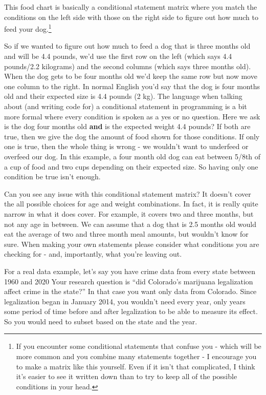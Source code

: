 \documentclass[
]{krantz}
\begin{document}
This food chart is basically a conditional statement matrix where you match the conditions on the left side with those on the right side to figure out how much to feed your dog.\footnote{If you encounter some conditional statements that confuse you - which will be more common and you combine many statements together - I encourage you to make a matrix like this yourself. Even if it isn't that complicated, I think it's easier to see it written down than to try to keep all of the possible conditions in your head.}

So if we wanted to figure out how much to feed a dog that is three months old and will be 4.4 pounds, we'd use the first row on the left (which says 4.4 pounds/2.2 kilograms) and the second columns (which says three months old). When the dog gets to be four months old we'd keep the same row but now move one column to the right. In normal English you'd say that the dog is four months old and their expected size is 4.4 pounds (2 kg). The language when talking about (and writing code for) a conditional statement in programming is a bit more formal where every condition is spoken as a yes or no question. Here we ask is the dog four months old \textbf{and} is the expected weight 4.4 pounds? If both are true, then we give the dog the amount of food shown for those conditions. If only one is true, then the whole thing is wrong - we wouldn't want to underfeed or overfeed our dog. In this example, a four month old dog can eat between 5/8th of a cup of food and two cups depending on their expected size. So having only one condition be true isn't enough.

Can you see any issue with this conditional statement matrix? It doesn't cover the all possible choices for age and weight combinations. In fact, it is really quite narrow in what it does cover. For example, it covers two and three months, but not any age in between. We can assume that a dog that is 2.5 months old would eat the average of two and three month meal amounts, but wouldn't know for sure. When making your own statements please consider what conditions you are checking for - and, importantly, what you're leaving out.

For a real data example, let's say you have crime data from every state between 1960 and 2020 Your research question is ``did Colorado's marijuana legalization affect crime in the state?'' In that case you want only data from Colorado. Since legalization began in January 2014, you wouldn't need every year, only years some period of time before and after legalization to be able to measure its effect. So you would need to subset based on the state and the year.
\end{document}
